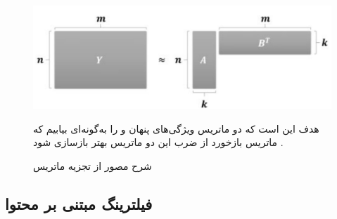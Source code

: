 \begin{itemize}
\begin{figure}[h!]
	\centering
	\includegraphics[scale=0.47]{section2/Matrixfactorization.jpg}
	\caption{
شرح مصور از تجزیه ماتریس}
\begin{flushright}
هدف این است که دو ماتریس ویژگی‌های پنهان
 و 
را به‌گونه‌ای بیابیم که ماتریس بازخورد
از ضرب این دو ماتریس بهتر بازسازی شود
\cite{Ezzat2018}.
\end{flushright}

	\label{Matrixfactorization}
\end{figure}


\end{itemize}
\par
\subsection{فیلترینگ مبتنی بر محتوا}

